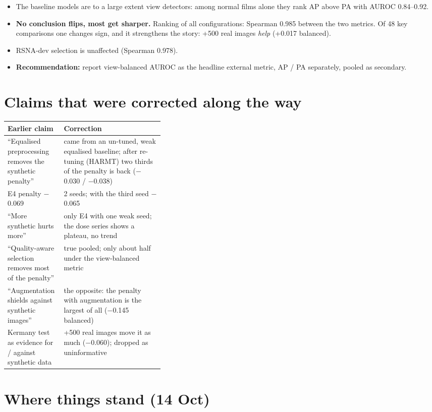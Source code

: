 \documentclass[10pt,a4paper]{article}
\begin{document}
\begin{itemize}
\item The baseline models are to a large extent view detectors: among normal films alone they rank AP above PA with AUROC 0.84--0.92.
\item \textbf{No conclusion flips, most get sharper.} Ranking of all configurations: Spearman 0.985 between the two metrics. Of 48
key comparisons one changes sign, and it strengthens the story: +500 real images \emph{help} (+0.017 balanced).
\item RSNA-dev selection is unaffected (Spearman 0.978).
\item \textbf{Recommendation:} report view-balanced AUROC as the headline external metric, AP / PA separately, pooled as secondary.
\end{itemize}

\section{Claims that were corrected along the way}

\begin{fixbox}
\small
\begin{tabularx}{\linewidth}{@{}p{0.36\linewidth} Y@{}}
\textbf{Earlier claim} & \textbf{Correction} \\
\midrule
``Equalised preprocessing removes the synthetic penalty'' & came from an un-tuned, weak equalised baseline; after re-tuning (HARMT) two thirds of the penalty is back ($-$0.030 / $-$0.038) \\
E4 penalty $-$0.069 & 2 seeds; with the third seed $-$0.065 \\
``More synthetic hurts more'' & only E4 with one weak seed; the dose series shows a plateau, no trend \\
``Quality-aware selection removes most of the penalty'' & true pooled; only about half under the view-balanced metric \\
``Augmentation shields against synthetic images'' & the opposite: the penalty with augmentation is the largest of all ($-$0.145 balanced) \\
Kermany test as evidence for / against synthetic data & +500 real images move it as much ($-$0.060); dropped as uninformative \\
\end{tabularx}
\end{fixbox}

\section{Where things stand (14 Oct)}
\end{document}
